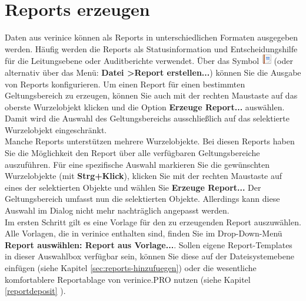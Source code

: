 \documentclass[a4paper,10pt]{book}
\begin{document}
\section{Reports erzeugen} \label{Reports erzeugen}
Daten aus verinice können als Reports in unterschiedlichen Formaten ausgegeben werden. Häufig werden die Reports als
Statusinformation und Entscheidungshilfe für die Leitungsebene oder Auditberichte verwendet. Über das Symbol \includegraphics[height=2ex]{Icon/Report.png}
(oder alternativ über das Menü: \textbf{Datei \textgreater  Report erstellen...}) können Sie die Ausgabe von Reports konfigurieren. Um einen Report
für einen bestimmten Geltungsbereich zu erzeugen, können Sie auch mit der rechten Maustaste auf das oberste Wurzelobjekt
klicken und die Option \textbf{Erzeuge Report...} auswählen. Damit wird die Auswahl des Geltungsbereichs ausschließlich auf das selektierte Wurzelobjekt
eingeschränkt.\\ Manche Reports unterstützen mehrere Wurzelobjekte. Bei diesen
Reports haben Sie die Möglichkeit den Report über alle verfügbaren
Geltungsbereiche auszuführen. Für eine spezifische Auswahl markieren Sie die
gewünschten Wurzelobjekte (mit \textbf{Strg+Klick}), klicken Sie mit der rechten
Maustaste auf eines der selektierten Objekte und wählen Sie \textbf{Erzeuge
Report...} Der Geltungsbereich umfasst nun die selektierten Objekte.
Allerdings kann diese Auswahl im Dialog nicht mehr nachträglich angepasst
werden.\\

Im ersten Schritt gilt es eine Vorlage für den zu erzeugenden Report
auszuwählen. Alle Vorlagen, die in verinice enthalten sind, finden Sie
im Drop-Down-Menü \textbf{Report auswählen: Report aus Vorlage...}.
Sollen eigene Report-Templates in dieser Auswahlbox verfügbar sein,
können Sie diese auf der Dateisystemebene einfügen (siehe Kapitel \ref{sec:reports-hinzufuegen})
oder die wesentliche komfortablere Reportablage von verinice.PRO nutzen (siehe Kapitel \ref{reportdeposit} ).
\end{document}
